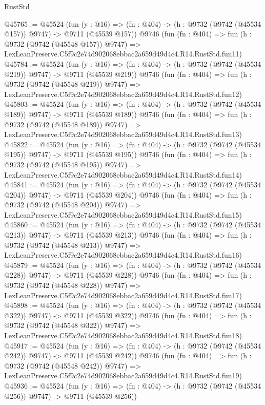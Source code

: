 \begin{lexlean}{RustStd}
\begin{coremodule}
@45765 := @45524
    (fun (y : @16) => (fn : @404) -> (h : @9732 (@9742 (@45534 @157)) @9747) -> @9711 (@45539 @157))
    @9746
    (fun (fn : @404) =>
    fun (h : @9732 (@9742 (@45548 @157)) @9747) =>
    LexLeanPreserve.C5f9c2e74d902068ebbac2a659d49d4c4.R14.RustStd.fun11)
@45784 := @45524
    (fun (y : @16) => (fn : @404) -> (h : @9732 (@9742 (@45534 @219)) @9747) -> @9711 (@45539 @219))
    @9746
    (fun (fn : @404) =>
    fun (h : @9732 (@9742 (@45548 @219)) @9747) =>
    LexLeanPreserve.C5f9c2e74d902068ebbac2a659d49d4c4.R14.RustStd.fun12)
@45803 := @45524
    (fun (y : @16) => (fn : @404) -> (h : @9732 (@9742 (@45534 @189)) @9747) -> @9711 (@45539 @189))
    @9746
    (fun (fn : @404) =>
    fun (h : @9732 (@9742 (@45548 @189)) @9747) =>
    LexLeanPreserve.C5f9c2e74d902068ebbac2a659d49d4c4.R14.RustStd.fun13)
@45822 := @45524
    (fun (y : @16) => (fn : @404) -> (h : @9732 (@9742 (@45534 @195)) @9747) -> @9711 (@45539 @195))
    @9746
    (fun (fn : @404) =>
    fun (h : @9732 (@9742 (@45548 @195)) @9747) =>
    LexLeanPreserve.C5f9c2e74d902068ebbac2a659d49d4c4.R14.RustStd.fun14)
@45841 := @45524
    (fun (y : @16) => (fn : @404) -> (h : @9732 (@9742 (@45534 @204)) @9747) -> @9711 (@45539 @204))
    @9746
    (fun (fn : @404) =>
    fun (h : @9732 (@9742 (@45548 @204)) @9747) =>
    LexLeanPreserve.C5f9c2e74d902068ebbac2a659d49d4c4.R14.RustStd.fun15)
@45860 := @45524
    (fun (y : @16) => (fn : @404) -> (h : @9732 (@9742 (@45534 @213)) @9747) -> @9711 (@45539 @213))
    @9746
    (fun (fn : @404) =>
    fun (h : @9732 (@9742 (@45548 @213)) @9747) =>
    LexLeanPreserve.C5f9c2e74d902068ebbac2a659d49d4c4.R14.RustStd.fun16)
@45879 := @45524
    (fun (y : @16) => (fn : @404) -> (h : @9732 (@9742 (@45534 @228)) @9747) -> @9711 (@45539 @228))
    @9746
    (fun (fn : @404) =>
    fun (h : @9732 (@9742 (@45548 @228)) @9747) =>
    LexLeanPreserve.C5f9c2e74d902068ebbac2a659d49d4c4.R14.RustStd.fun17)
@45898 := @45524
    (fun (y : @16) => (fn : @404) -> (h : @9732 (@9742 (@45534 @322)) @9747) -> @9711 (@45539 @322))
    @9746
    (fun (fn : @404) =>
    fun (h : @9732 (@9742 (@45548 @322)) @9747) =>
    LexLeanPreserve.C5f9c2e74d902068ebbac2a659d49d4c4.R14.RustStd.fun18)
@45917 := @45524
    (fun (y : @16) => (fn : @404) -> (h : @9732 (@9742 (@45534 @242)) @9747) -> @9711 (@45539 @242))
    @9746
    (fun (fn : @404) =>
    fun (h : @9732 (@9742 (@45548 @242)) @9747) =>
    LexLeanPreserve.C5f9c2e74d902068ebbac2a659d49d4c4.R14.RustStd.fun19)
@45936 := @45524
    (fun (y : @16) => (fn : @404) -> (h : @9732 (@9742 (@45534 @256)) @9747) -> @9711 (@45539 @256))

\end{coremodule}
\end{lexlean}
